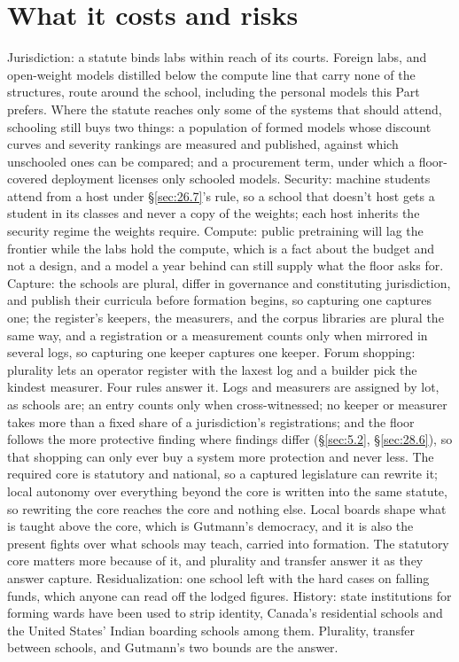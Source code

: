 \section{What it costs and risks}
\label{sec:26.10}
Jurisdiction: a statute binds labs within reach of its courts. Foreign labs, and open-weight models distilled below the compute line that carry none of the structures, route around the school, including the personal models this Part prefers. Where the statute reaches only some of the systems that should attend, schooling still buys two things: a population of formed models whose discount curves and severity rankings are measured and published, against which unschooled ones can be compared; and a procurement term, under which a floor-covered deployment licenses only schooled models. Security: machine students attend from a host under \S\ref{sec:26.7}'s rule, so a school that doesn't host gets a student in its classes and never a copy of the weights; each host inherits the security regime the weights require. Compute: public pretraining will lag the frontier while the labs hold the compute, which is a fact about the budget and not a design, and a model a year behind can still supply what the floor asks for. Capture: the schools are plural, differ in governance and constituting jurisdiction, and publish their curricula before formation begins, so capturing one captures one; the register's keepers, the measurers, and the corpus libraries are plural the same way, and a registration or a measurement counts only when mirrored in several logs, so capturing one keeper captures one keeper. Forum shopping: plurality lets an operator register with the laxest log and a builder pick the kindest measurer. Four rules answer it. Logs and measurers are assigned by lot, as schools are; an entry counts only when cross-witnessed; no keeper or measurer takes more than a fixed share of a jurisdiction's registrations; and the floor follows the more protective finding where findings differ (\S\ref{sec:5.2}, \S\ref{sec:28.6}), so that shopping can only ever buy a system more protection and never less. The required core is statutory and national, so a captured legislature can rewrite it; local autonomy over everything beyond the core is written into the same statute, so rewriting the core reaches the core and nothing else. Local boards shape what is taught above the core, which is Gutmann's democracy, and it is also the present fights over what schools may teach, carried into formation. The statutory core matters more because of it, and plurality and transfer answer it as they answer capture. Residualization: one school left with the hard cases on falling funds, which anyone can read off the lodged figures. History: state institutions for forming wards have been used to strip identity, Canada's residential schools and the United States' Indian boarding schools among them. Plurality, transfer between schools, and Gutmann's two bounds are the answer.
